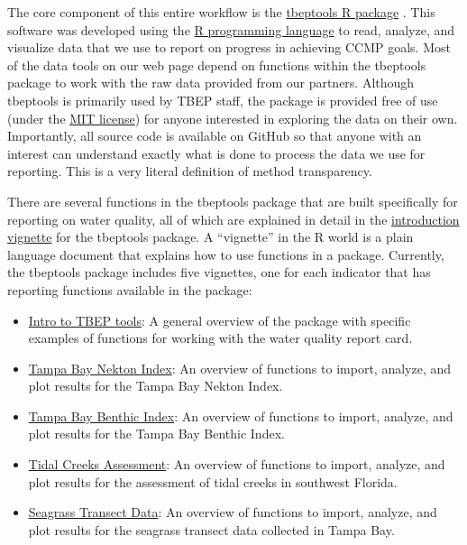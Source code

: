 \documentclass[
]{book}
\providecommand{\tightlist}{%
  \setlength{\itemsep}{0pt}\setlength{\parskip}{0pt}}
\begin{document}
The core component of this entire workflow is the \href{https://tbep-tech.github.io/tbeptools/}{tbeptools R package} \citep{Beck21}. This software was developed using the \href{https://cran.r-project.org/}{R programming language} to read, analyze, and visualize data that we use to report on progress in achieving CCMP goals. Most of the data tools on our web page depend on functions within the tbeptools package to work with the raw data provided from our partners. Although tbeptools is primarily used by TBEP staff, the package is provided free of use (under the \href{https://tldrlegal.com/license/mit-license}{MIT license}) for anyone interested in exploring the data on their own. Importantly, all source code is available on GitHub so that anyone with an interest can understand exactly what is done to process the data we use for reporting. This is a very literal definition of method transparency.

There are several functions in the tbeptools package that are built specifically for reporting on water quality, all of which are explained in detail in the \href{https://tbep-tech.github.io/tbeptools/articles/intro.html}{introduction vignette} for the tbeptools package. A ``vignette'' in the R world is a plain language document that explains how to use functions in a package. Currently, the tbeptools package includes five vignettes, one for each indicator that has reporting functions available in the package:

\begin{itemize}
\tightlist
\item
  \href{https://tbep-tech.github.io/tbeptools/articles/intro.html}{Intro to TBEP tools}: A general overview of the package with specific examples of functions for working with the water quality report card.
\item
  \href{https://tbep-tech.github.io/tbeptools/articles/tbni.html}{Tampa Bay Nekton Index}: An overview of functions to import, analyze, and plot results for the Tampa Bay Nekton Index.
\item
  \href{https://tbep-tech.github.io/tbeptools/articles/tbbi.html}{Tampa Bay Benthic Index}: An overview of functions to import, analyze, and plot results for the Tampa Bay Benthic Index.
\item
  \href{https://tbep-tech.github.io/tbeptools/articles/tidalcreeks.html}{Tidal Creeks Assessment}: An overview of functions to import, analyze, and plot results for the assessment of tidal creeks in southwest Florida.
\item
  \href{https://tbep-tech.github.io/tbeptools/articles/seagrasstransect.html}{Seagrass Transect Data}: An overview of functions to import, analyze, and plot results for the seagrass transect data collected in Tampa Bay.
\end{itemize}
\end{document}
